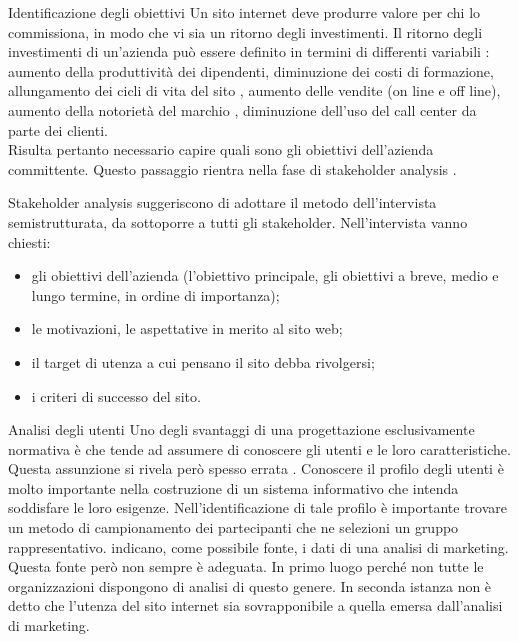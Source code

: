\documentclass[pdf,mpa]{prosper}
\begin{document}
\begin{slide}{Identificazione degli obiettivi}
Un sito internet deve produrre valore per chi lo commissiona, in modo che vi sia un ritorno degli investimenti.
Il ritorno degli investimenti di un'azienda può essere definito in termini di differenti variabili \citep{Conci2006}: 
aumento della produttività dei dipendenti, diminuzione dei costi di formazione, allungamento dei cicli di vita del sito \citep{FuccellaPizzolato1998}, aumento delle vendite (on line e off line), aumento della notorietà del marchio \citep{Zeni2006}, diminuzione dell'uso del call center da parte dei clienti.\\
Risulta pertanto necessario capire quali sono gli obiettivi dell'azienda committente. Questo passaggio rientra nella fase di stakeholder analysis \citep{Sinha2004}.
\end{slide}

\begin{slide}{Stakeholder analysis}
\cite{CaprioGhiglione2003} suggeriscono di adottare il metodo dell'intervista semistrutturata, da sottoporre a tutti gli stakeholder. Nell'intervista vanno chiesti:
\begin{itemize}
\item gli obiettivi dell'azienda (l'obiettivo principale, gli obiettivi a breve, medio e lungo termine, in ordine di importanza);
\item le motivazioni, le aspettative in merito al sito web;
\item il target di utenza a cui pensano il  sito debba rivolgersi;
\item i criteri di successo del sito.
\end{itemize}
\end{slide}

\begin{slide}{Analisi degli utenti}
Uno degli svantaggi di una progettazione esclusivamente normativa è che tende ad assumere di conoscere gli utenti e le loro caratteristiche. Questa assunzione si rivela però spesso errata \citep{Nielsen1996}. Conoscere il profilo degli utenti è molto importante nella costruzione di un sistema informativo che intenda soddisfare le loro esigenze. Nell'identificazione di tale profilo è importante trovare un metodo di campionamento dei partecipanti che ne selezioni un gruppo rappresentativo. \cite{FuccellaPizzolato1998} indicano, come possibile fonte, i dati di una analisi di marketing. Questa fonte però non sempre è adeguata. In primo luogo perché non tutte le organizzazioni dispongono di analisi di questo genere. In seconda istanza non è detto che l'utenza del sito internet sia sovrapponibile a quella emersa dall'analisi di marketing.

\end{slide}
\end{document}

